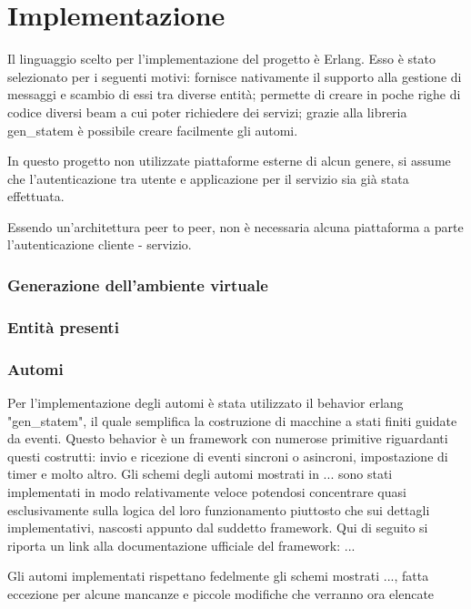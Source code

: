 
\chapter{Implementazione}

Il linguaggio scelto per l'implementazione del progetto è Erlang. Esso è stato selezionato per i seguenti motivi: fornisce nativamente il supporto alla gestione di messaggi e scambio di essi tra diverse entità; permette di creare in poche righe di codice diversi beam a cui poter richiedere dei servizi; grazie alla libreria gen\_statem è possibile creare facilmente gli automi.

In questo progetto non utilizzate piattaforme esterne di alcun genere, si assume che l'autenticazione tra utente e applicazione per il servizio sia già stata effettuata.

Essendo un'architettura peer to peer, non è necessaria alcuna piattaforma a parte l'autenticazione cliente - servizio.

\subsection{Generazione dell'ambiente virtuale}

\subsection{Entità presenti}
\subsection{Automi}
Per l'implementazione degli automi è stata utilizzato il behavior erlang "gen\_statem", il quale semplifica la costruzione di macchine a stati finiti guidate da eventi. Questo behavior è un framework con numerose primitive riguardanti questi costrutti: invio e ricezione di eventi sincroni o asincroni, impostazione di timer e molto altro. Gli schemi degli automi mostrati in ... sono stati implementati in modo relativamente veloce potendosi concentrare quasi esclusivamente sulla logica del loro funzionamento piuttosto che sui dettagli implementativi, nascosti appunto dal suddetto framework. 
Qui di seguito si riporta un link alla documentazione ufficiale del framework: ...

Gli automi implementati rispettano fedelmente gli schemi mostrati ..., fatta eccezione per alcune mancanze e piccole modifiche che verranno ora elencate

